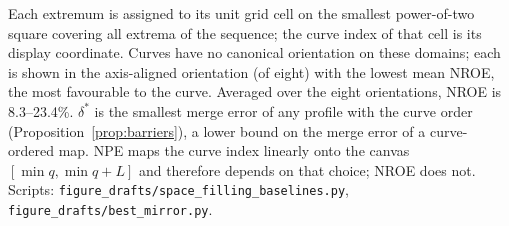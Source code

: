 \begin{table}[H]
\begin{tabular}{llrrrrrr}
\bottomrule\end{tabular}
\par\smallskip\parbox{\linewidth}{\footnotesize Each extremum is assigned to its unit grid cell on the smallest power-of-two square covering all extrema of the sequence; the curve index of that cell is its display coordinate. Curves have no canonical orientation on these domains; each is shown in the axis-aligned orientation (of eight) with the lowest mean NROE, the most favourable to the curve. Averaged over the eight orientations, NROE is 8.3--23.4\%. $\delta^*$ is the smallest merge error of any profile with the curve order (Proposition~\ref{prop:barriers}), a lower bound on the merge error of a curve-ordered map. NPE maps the curve index linearly onto the canvas $[\min q,\min q+L]$ and therefore depends on that choice; NROE does not. Scripts: \texttt{figure\_drafts/space\_filling\_baselines.py}, \texttt{figure\_drafts/best\_mirror.py}.}
\end{table}
